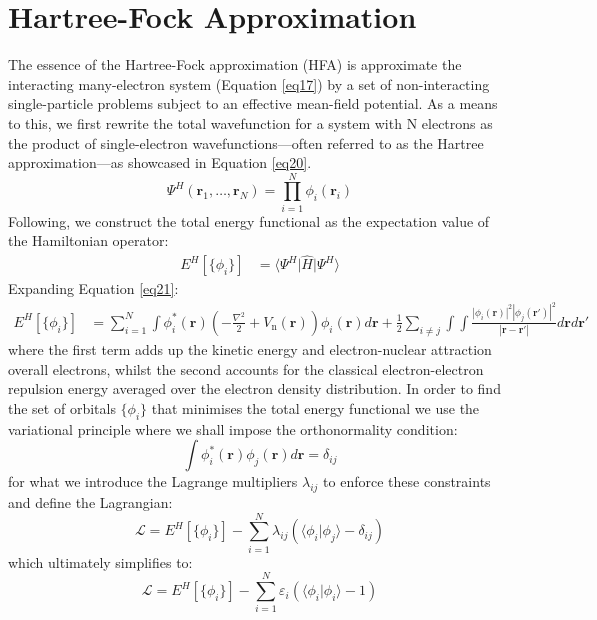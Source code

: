 
\section{Hartree-Fock Approximation}
The essence of the Hartree-Fock approximation (HFA) is approximate the interacting many-electron system (Equation \ref{eq17}) by a set of non-interacting single-particle problems subject to an effective mean-field potential\supercite{martin2016interacting, helgaker2014molecular, feng2005introduction}. As a means to this, we first rewrite the total wavefunction for a system with N electrons as the product of single-electron wavefunctions---often referred to as the Hartree approximation\supercite{Hartree1928}---as showcased in Equation \ref{eq20}. 
\begin{equation}
  \Psi^H(\mathbf{r}_1, \dots, \mathbf{r}_N) = \prod_{i=1}^N \phi_i(\mathbf{r}_i)
  \label{eq20}
\end{equation}
Following, we construct the total energy functional as the expectation value of the Hamiltonian operator:
\begin{equation}
  \label{eq21}
\begin{aligned}
  E^{H}[\{\phi_i\}] &= \bigg\langle \Psi^H \bigg| \hat{H} \bigg| \Psi^H \bigg\rangle 
\end{aligned}
\end{equation}
Expanding Equation \ref{eq21}:
\begin{equation}
  \label{eq22}
  \begin{split}
    E^{H}[\{\phi_i\}] &= \sum^N_{i=1} \int \phi_i^*(\mathbf{r}) \left(-\frac{\nabla^2}{2} + V_{\text{n}}(\mathbf{r})\right) \phi_i(\mathbf{r}) d\mathbf{r}  + \frac{1}{2} \sum_{i\neq j} \int\int \frac{|\phi_i(\mathbf{r})|^2 |\phi_j(\mathbf{r'})|^2 }{|\mathbf{r} - \mathbf{r'}|} d\mathbf{r} d\mathbf{r'}
  \end{split}
\end{equation}
where the first term adds up the kinetic energy and electron-nuclear attraction overall electrons, whilst the second accounts for the classical electron-electron repulsion energy averaged over the electron density distribution. In order to find the set of orbitals $\{\phi_i\}$ that minimises the total energy functional we use the variational principle where we shall impose the orthonormality condition: 
\begin{equation}
  \label{eq23}
  \int \phi_i^*(\mathbf{r}) \phi_j(\mathbf{r}) d\mathbf{r} = \delta_{ij}
\end{equation}
for what we introduce the Lagrange multipliers $\lambda_{ij}$ to enforce these constraints and define the Lagrangian:
\begin{equation}
  \label{eq24}
  \mathcal{L} = E^H[\{\phi_i\}] - \sum_{i=1}^{N}\lambda_{ij} ( \langle\phi_i|\phi_j\rangle - \delta_{ij})
\end{equation}
which ultimately simplifies to:
\begin{equation}
  \label{eq25}
  \mathcal{L} = E^H[\{\phi_i\}] - \sum_{i=1}^{N}\varepsilon_{i} ( \langle\phi_i|\phi_i\rangle - 1)
\end{equation}

